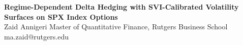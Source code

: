 \documentclass[9pt, letterpaper, landscape]{article}
\begin{document}
\begin{tcolorbox}[
  colback=Navy, colframe=Navy, sharp corners, boxrule=0pt,
  top=4pt, bottom=3pt, left=10pt, right=10pt,
  before skip=0pt, after skip=4pt
]
\centering
{\normalsize\bfseries\color{white} Regime-Dependent Delta Hedging with SVI-Calibrated Volatility Surfaces on SPX Index Options}\\[2pt]
{\small\color{Gold} Zaid Annigeri \quad{\color{white}|}\quad Master of Quantitative Finance, Rutgers Business School \quad{\color{white}|}\quad\color{white} ma.zaid@rutgers.edu}
\end{tcolorbox}

\end{document}
